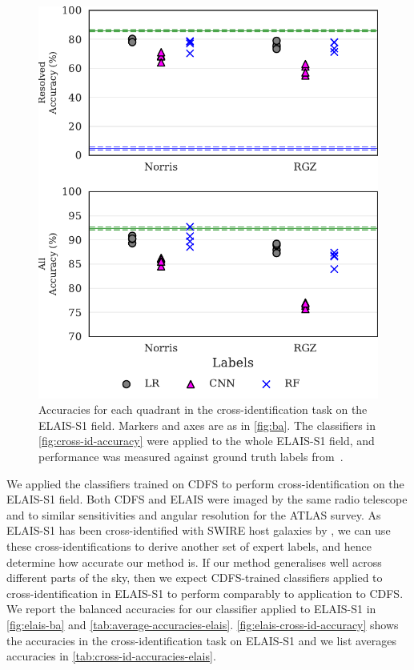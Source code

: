 \documentclass[fleqn,usenatbib,usedcolumn]{mnras}
\begin{document}
  \begin{figure}
    \centering
    \includegraphics[width=\columnwidth]{images/elais_cross_identification_grid.pdf}
    \caption{Accuracies for each quadrant in the cross-identification
      task on the ELAIS-S1 field. Markers and axes are as in \autoref{fig:ba}.
      The classifiers in \autoref{fig:cross-id-accuracy} were applied to the
      whole ELAIS-S1 field, and performance was measured against ground truth
      labels from~\citet{middelberg08}.
      \label{fig:elais-cross-id-accuracy}}
  \end{figure}

  We applied the classifiers trained on CDFS to perform cross-identification
  on the ELAIS-S1 field. Both CDFS and ELAIS were imaged by the same radio
  telescope and to similar sensitivities and angular resolution for the ATLAS
  survey.  As ELAIS-S1 has been cross-identified with SWIRE host galaxies by
  \citet{middelberg08}, we can use these cross-identifications to derive
  another set of expert labels, and hence determine how accurate our method
  is. If our method generalises well across different parts of the sky, then
  we expect CDFS-trained classifiers applied to cross-identification in
  ELAIS-S1 to perform comparably to application to CDFS. We report the
  balanced accuracies for our classifier applied to ELAIS-S1 in
  \autoref{fig:elais-ba} and \autoref{tab:average-accuracies-elais}.
  \autoref{fig:elais-cross-id-accuracy} shows the accuracies in the
  cross-identification task on ELAIS-S1 and we list averages accuracies in
  \autoref{tab:cross-id-accuracies-elais}.
\end{document}
